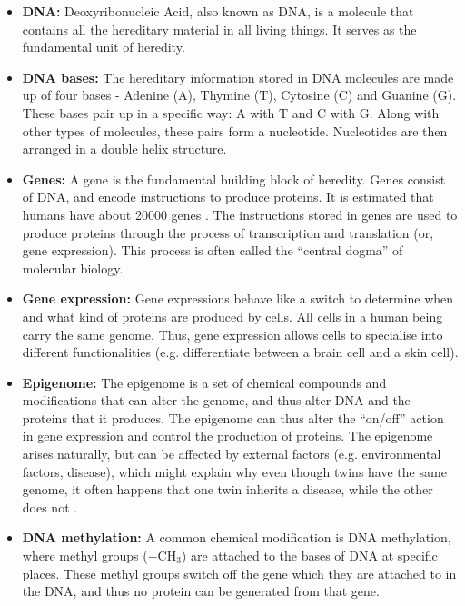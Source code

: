 \documentclass[12pt, twoside, a4paper]{article}
\begin{document}
\begin{itemize}
\item \textbf{DNA:} Deoxyribonucleic Acid, also known as DNA, is a molecule that contains all the hereditary material in all living things. It serves as the fundamental unit of heredity.

\item \textbf{DNA bases:} The hereditary information stored in DNA molecules are made up of four bases - Adenine (A), Thymine (T), Cytosine (C) and Guanine (G). These bases pair up in a specific way: A with T and C with G. Along with other types of molecules, these pairs form a nucleotide. Nucleotides are then arranged in a double helix structure.

\item \textbf{Genes:} A gene is the fundamental building block of heredity. Genes consist of DNA, and encode instructions to produce proteins. It is estimated that humans have about 20000 genes \cite{RefWorks:109}. The instructions stored in genes are used to produce proteins through the process of transcription and translation (or, gene expression). This process is often called the ``central dogma'' of molecular biology.

\item \textbf{Gene expression:} Gene expressions behave like a switch to determine when and what kind of proteins are produced by cells. All cells in a human being carry the same genome. Thus, gene expression allows cells to specialise into different functionalities (e.g. differentiate between a brain cell and a skin cell).

\item \textbf{Epigenome:} The epigenome is a set of chemical compounds and modifications that can alter the genome, and thus alter DNA and the proteins that it produces. The epigenome can thus alter the ``on/off'' action in gene expression and control the production of proteins. The epigenome arises naturally, but can be affected by external factors (e.g. environmental factors, disease), which might explain why even though twins have the same genome, it often happens that one twin inherits a disease, while the other does not \cite{RefWorks:107}.

\item \textbf{DNA methylation:} A common chemical modification is DNA methylation, where methyl groups ($-$CH$_3$) are attached to the bases of DNA at specific places. These methyl groups switch off the gene which they are attached to in the DNA, and thus no protein can be generated from that gene.
\end{itemize}
\end{document}
